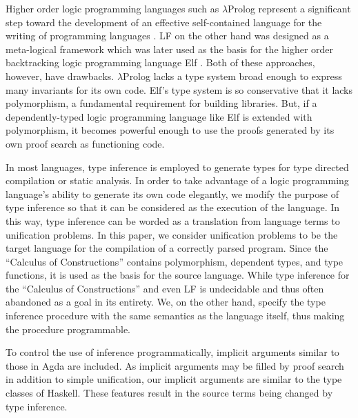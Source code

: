 Higher order logic programming languages such as $\lambda$Prolog represent a significant
step toward the development of an effective self-contained language for the writing 
of programming languages \citep{miller1988overview}. 
LF \citep{harper1993framework} on the other hand was designed as a meta-logical framework 
which was later used as the basis for the higher order backtracking logic programming language Elf \citep{pfenning1991logic}.
Both of these approaches, however, have drawbacks. 
$\lambda$Prolog lacks a type system broad enough to express many invariants for its own code. 
Elf’s type system is so conservative that it lacks polymorphism, a fundamental requirement for building
libraries. But, if a dependently-typed logic programming language like Elf is extended with polymorphism, 
it becomes powerful enough to use the proofs generated
by its own proof search as functioning code. 

In most languages, type inference is employed to generate types for type directed compilation or static 
analysis.
In order to take advantage of a logic programming language’s ability to generate its own code elegantly, 
we modify the purpose of type
inference so that it can be considered as the execution of the language.
In this way, type inference can be worded as a translation from language terms to unification
problems. In this paper, we consider unification problems to be the target
language for the compilation of a correctly parsed program. Since the ``Calculus of Constructions''
\citep{coquand1986calculus} contains polymorphism, dependent types, and type functions, it is used
as the basis for the source language. 
While type inference for the ``Calculus of Constructions'' and even LF is undecidable\citep{Dowek93tlca} 
and thus often abandoned as a goal in its entirety. 
We, on the other hand, specify the 
type inference procedure with the same semantics as the language itself,
thus making the procedure programmable.

To control the use of inference programmatically, implicit arguments similar to those
in Agda are included. As implicit arguments may be filled by proof search in addition
to simple unification, our implicit arguments are similar to the type classes of Haskell. 
These features result in the source terms being changed by type inference.

